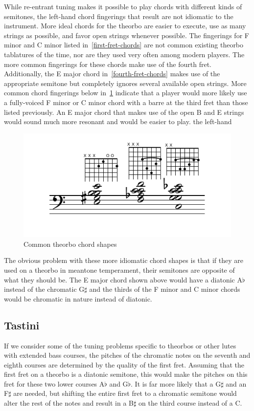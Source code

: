 While re-entrant tuning makes it possible to play chords with different kinds of
semitones, the left-hand chord fingerings that result are not idiomatic to the instrument.
 More ideal chords for the theorbo are easier to execute, use as many strings as possible,
and favor open strings whenever possible.  The fingerings for F minor and C minor listed
in~\ref{first-fret-chords} are not common existing theorbo tablatures of the time, nor are
they used very often among modern players. The more common fingerings for these chords
make use of the fourth fret.  Additionally, the E major chord in~\ref{fourth-fret-chords}
makes use of the appropriate semitone but completely ignores several available open
strings.  More common chord fingerings below in~\ref{common-chords} indicate that a player
would more likely use a fully-voiced F minor or C minor chord with a barre at the third
fret than those listed previously.  An E major chord that makes use of the open B and
E strings would sound much more resonant and would be easier to play.
the left-hand
\begin{figure}[h]
\centering
\includegraphics{examples/common-chords.pdf}
\caption{Common theorbo chord shapes}
\label{common-chords}
\end{figure}
The obvious problem with these more idiomatic chord shapes is that if they are used on
a theorbo in meantone temperament, their semitones are opposite of what they should be.
The E major chord shown above would have a diatonic A$\flat$ instead of the chromatic
G$\sharp$ and the thirds of the F minor and C minor chords would be chromatic in nature
instead of diatonic.


\subsection{Tastini}

If we consider some of the tuning problems specific to theorbos or other lutes with
extended bass courses,
the pitches of the chromatic notes on the seventh and eighth courses are determined by the
quality of the first fret.  Assuming that the first fret on a theorbo is a diatonic
semitone, this would make the pitches on this fret for these two lower courses A$\flat$
and G$\flat$.  It is far more likely that a G$\sharp$ and an F$\sharp$ are needed, but
shifting the entire first fret to a chromatic semitone would alter the rest of the notes
and result in a B$\sharp$ on the third course instead of a C.

